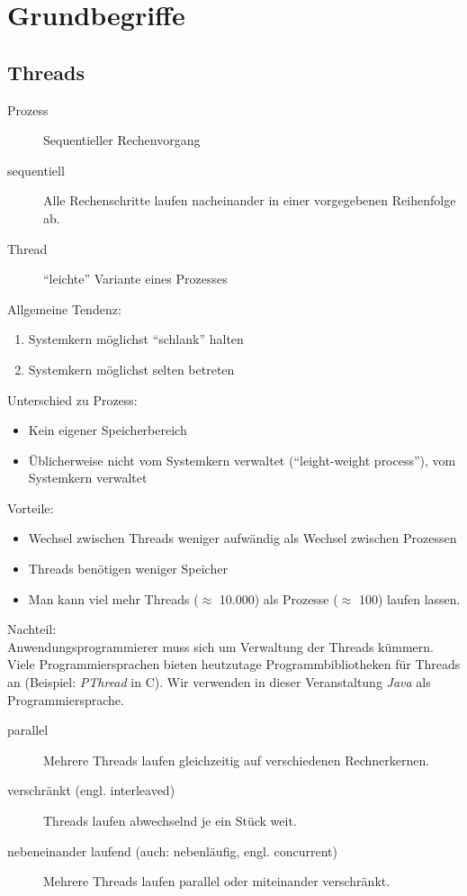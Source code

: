 \chapter{Grundbegriffe}

\section{Threads}

\begin{description}
\item[Prozess] Sequentieller Rechenvorgang
\item[sequentiell] Alle Rechenschritte laufen nacheinander in einer vorgegebenen Reihenfolge ab.
\item[Thread] "`leichte"' Variante eines Prozesses
\end{description}

Allgemeine Tendenz:
\begin{enumerate}
\item Systemkern möglichst "`schlank"' halten
\item Systemkern möglichst selten betreten
\end{enumerate}

Unterschied zu Prozess:
\begin{itemize}
\item Kein eigener Speicherbereich
\item Üblicherweise nicht vom Systemkern verwaltet ("`leight-weight process"'), vom Systemkern verwaltet
\end{itemize}

Vorteile:
\begin{itemize}
\item Wechsel zwischen Threads weniger aufwändig als Wechsel zwischen Prozessen
\item Threads benötigen weniger Speicher
\item Man kann viel mehr Threads ($\approx$ 10.000) als Prozesse ($\approx$ 100) laufen lassen.
\end{itemize}

Nachteil:\\
Anwendungsprogrammierer muss sich um Verwaltung der Threads kümmern. Viele Programmiersprachen bieten heutzutage Programmbibliotheken für Threads an (Beispiel: \emph{PThread} in C). Wir verwenden in dieser Veranstaltung \emph{Java} als Programmiersprache.

\begin{description}
\item[parallel] Mehrere Threads laufen gleichzeitig auf verschiedenen Rechnerkernen.
\item[verschränkt (engl. interleaved)] Threads laufen abwechselnd je ein Stück weit.
\item[nebeneinander laufend (auch: nebenläufig, engl. concurrent)] Mehrere Threads laufen parallel oder miteinander verschränkt.
\end{description}

